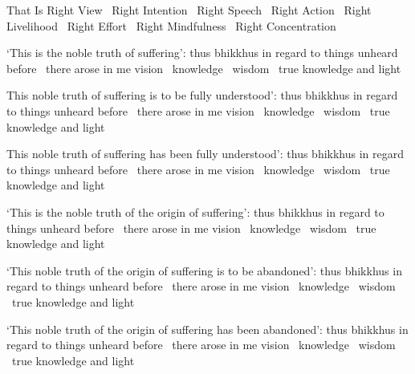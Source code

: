 \begin{english-only-hang}
  That Is Right View \breathmark\ Right Intention \breathmark\ Right Speech \breathmark\ Right Action \breathmark\ Right Livelihood \breathmark\ Right Effort \breathmark\ Right Mindfulness \breathmark\ Right Concentration
\end{english-only-hang}

\begin{english-only-hang}
  `This is the noble truth of suffering': thus bhikkhus in regard to things unheard before \breathmark\ there arose in me vision \breathmark\ knowledge \breathmark\ wisdom \breathmark\ true knowledge and light
\end{english-only-hang}

\begin{english-only-hang}
  This noble truth of suffering is to be fully understood': thus bhikkhus in regard to things unheard before \breathmark\ there arose in me vision \breathmark\ knowledge \breathmark\ wisdom \breathmark\ true knowledge and light
\end{english-only-hang}

\begin{english-only-hang}
  This noble truth of suffering has been fully understood': thus bhikkhus in regard to things unheard before \breathmark\ there arose in me vision \breathmark\ knowledge \breathmark\ wisdom \breathmark\ true knowledge and light
\end{english-only-hang}

\begin{english-only-hang}
  `This is the noble truth of the origin of suffering': thus bhikkhus in regard to things unheard before \breathmark\ there arose in me vision \breathmark\ knowledge \breathmark\ wisdom \breathmark\ true knowledge and light
\end{english-only-hang}

\begin{english-only-hang}
  `This noble truth of the origin of suffering is to be abandoned': thus bhikkhus in regard to things unheard before \breathmark\ there arose in me vision \breathmark\ knowledge \breathmark\ wisdom \breathmark\ true knowledge and light
\end{english-only-hang}

\begin{english-only-hang}
  `This noble truth of the origin of suffering has been abandoned': thus bhikkhus in regard to things unheard before \breathmark\ there arose in me vision \breathmark\ knowledge \breathmark\ wisdom \breathmark\ true knowledge and light
\end{english-only-hang}

